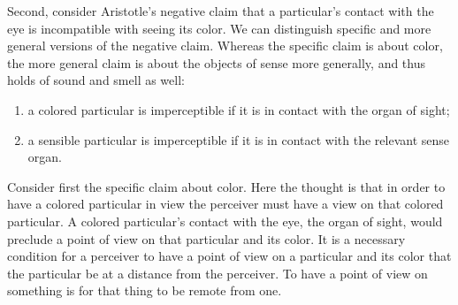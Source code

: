 Second, consider Aristotle's negative claim that a particular's contact with the eye is incompatible with seeing its color.  We can distinguish specific and more general versions of the negative claim. Whereas the specific claim is about color, the more general claim is about the objects of sense more generally, and thus holds of sound and smell as well:
\begin{enumerate}[(1)]
	\item a colored particular is imperceptible if it is in contact with the organ of sight;
	\item a sensible particular is imperceptible if it is in contact with the relevant sense organ.
\end{enumerate}

Consider first the specific claim about color. Here the thought is that in order to have a colored particular in view the perceiver must have a view on that colored particular. A colored particular's contact with the eye, the organ of sight, would preclude a point of view on that particular and its color. It is a necessary condition for a perceiver to have a point of view on a particular and its color that the particular be at a distance from the perceiver. To have a point of view on something is for that thing to be remote from one.

